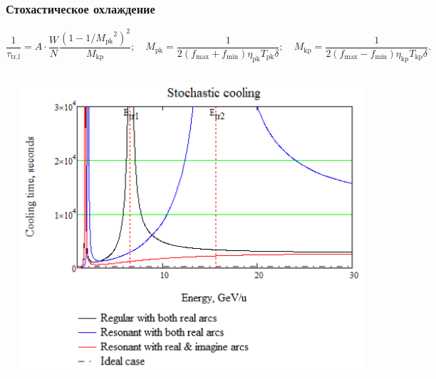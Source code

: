 \begin{frame}
	\frametitle{Стохастическое охлаждение}
	\begin{equation}
		\frac{1}{\tau_{\text{tr,l}}}=A\cdot\frac{W}{N} \frac{\left(1-1 / {M_{\text{pk}}}^2\right)^2}{M_{\text{kp}}}; \quad
		M_{\text{pk}} =\frac{1}{2\left(f_{\max}+f_{\min}\right) \eta_{\textrm{pk}} T_{\textrm{pk}} \delta}; \quad 
		M_{\text{kp}} =\frac{1}{2\left(f_{\max}-f_{\min}\right) \eta_{\textrm{kp}} T_{\textrm{kp}} \delta}.
	\end{equation}

	\begin{columns}
		\begin{column}{0.5\textwidth}
			\raggedright
		\end{column}
		\begin{column}{0.5\textwidth}
			\begin{minipage}{\linewidth}
				\centering
				\includegraphics[width=0.7\linewidth]{images/1_SC_wide}
			\end{minipage}
		\end{column}
	\end{columns}
\end{frame}
